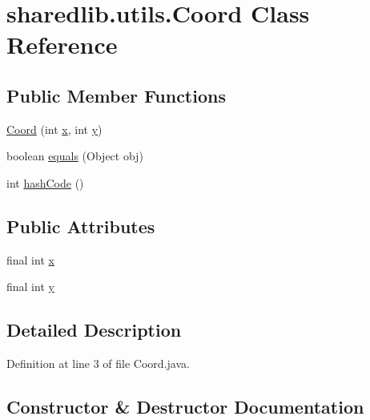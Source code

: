 \hypertarget{classsharedlib_1_1utils_1_1_coord}{}\section{sharedlib.\+utils.\+Coord Class Reference}
\label{classsharedlib_1_1utils_1_1_coord}
\subsection*{Public Member Functions}
\begin{DoxyCompactItemize}
\item 
\hyperlink{classsharedlib_1_1utils_1_1_coord_a457d1069b8ca4291ff5e7fa7fb9f6b06}{Coord} (int \hyperlink{classsharedlib_1_1utils_1_1_coord_a97ec9bc6bdd9e2ccf529d47c13b038ad}{x}, int \hyperlink{classsharedlib_1_1utils_1_1_coord_a388e7f4ee703efeac9bfb152cea6c248}{y})
\item 
boolean \hyperlink{classsharedlib_1_1utils_1_1_coord_a017f238582d01dd9016a8ab221086952}{equals} (Object obj)
\item 
int \hyperlink{classsharedlib_1_1utils_1_1_coord_a85806d6c4fa96af74e07e4135c023810}{hash\+Code} ()
\end{DoxyCompactItemize}
\subsection*{Public Attributes}
\begin{DoxyCompactItemize}
\item 
final int \hyperlink{classsharedlib_1_1utils_1_1_coord_a97ec9bc6bdd9e2ccf529d47c13b038ad}{x}
\item 
final int \hyperlink{classsharedlib_1_1utils_1_1_coord_a388e7f4ee703efeac9bfb152cea6c248}{y}
\end{DoxyCompactItemize}


\subsection{Detailed Description}


Definition at line 3 of file Coord.\+java.



\subsection{Constructor \& Destructor Documentation}
\hypertarget{classsharedlib_1_1utils_1_1_coord_a457d1069b8ca4291ff5e7fa7fb9f6b06}{}\label{classsharedlib_1_1utils_1_1_coord_a457d1069b8ca4291ff5e7fa7fb9f6b06} 
